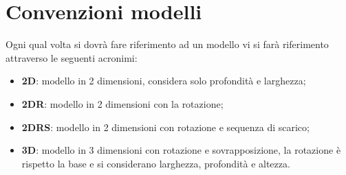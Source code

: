 \section{Convenzioni modelli}
Ogni qual volta si dovrà fare riferimento ad un modello vi si farà riferimento attraverso le seguenti acronimi:
\begin{itemize}
	\item \textbf{2D}: modello in 2 dimensioni, considera solo profondità e larghezza;
	\item \textbf{2DR}: modello in 2 dimensioni con la rotazione;
	\item \textbf{2DRS}: modello in 2 dimensioni con rotazione e sequenza di scarico;
	\item \textbf{3D}: modello in 3 dimensioni con rotazione e sovrapposizione, la rotazione è rispetto la base e si considerano larghezza, profondità e altezza.
\end{itemize}